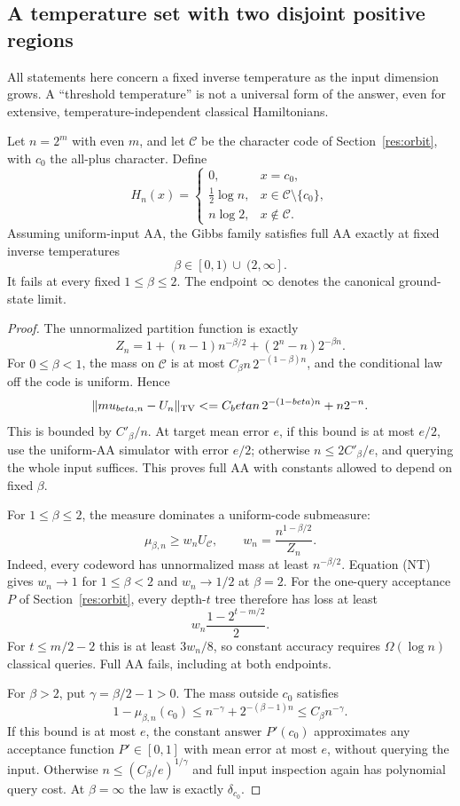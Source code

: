 \subsection{A temperature set with two disjoint positive regions}
\label{sec:resolution-nonmonotone}

All statements here concern a fixed inverse temperature as the input
dimension grows. A ``threshold temperature'' is not a universal form
of the answer, even for extensive, temperature-independent classical
Hamiltonians.

\begin{theorem}
Let $n=2^m$ with even $m$, and let $\mathcal C$ be the character code
of Section~\ref{res:orbit}, with $c_0$ the all-plus character. Define
\[
 H_n(x)=
 \begin{cases}
 0,&x=c_0,\\
 \tfrac12\log n,&x\in\mathcal C\setminus\{c_0\},\\
 n\log2,&x\notin\mathcal C.
 \end{cases}
\]
Assuming uniform-input AA, the Gibbs family satisfies full AA exactly
at fixed inverse temperatures
\[
 \boxed{\quad\beta\in[0,1)\ \cup\ (2,\infty].\quad}
\]
It fails at every fixed $1\le\beta\le2$. The endpoint $\infty$
denotes the canonical ground-state limit.
\end{theorem}

\begin{proof}
The unnormalized partition function is exactly
\[
 Z_n=1+(n-1)n^{-\beta/2}+(2^n-n)2^{-\beta n}.
 \tag{NT}
\]
For $0\le\beta<1$, the mass on $\mathcal C$ is at most
$C_\beta n\,2^{-(1-\beta)n}$, and the conditional law off the code
is uniform. Hence
\[
 \|\mu_{\beta,n}-U_n\|_{\rm TV}
 \le C_\beta n\,2^{-(1-\beta)n}+n2^{-n}.
\]
This is bounded by $C'_\beta/n$. At target mean error $e$, if this
bound is at most $e/2$, use the uniform-AA simulator with error $e/2$;
otherwise $n\le2C'_\beta/e$, and querying the whole input suffices.
This proves full AA with constants allowed to depend on fixed $\beta$.

For $1\le\beta\le2$, the measure dominates a uniform-code
submeasure:
\[
 \mu_{\beta,n}\ge w_n U_{\mathcal C},\qquad
 w_n=\frac{n^{1-\beta/2}}{Z_n}.
\]
Indeed, every codeword has unnormalized mass at least $n^{-\beta/2}$.
Equation (NT) gives $w_n\to1$ for $1\le\beta<2$ and $w_n\to1/2$
at $\beta=2$. For the one-query acceptance $P$ of
Section~\ref{res:orbit}, every depth-$t$ tree therefore has loss at
least
\[
 w_n\frac{1-2^{t-m/2}}2.
\]
For $t\le m/2-2$ this is at least $3w_n/8$, so constant accuracy
requires $\Omega(\log n)$ classical queries. Full AA fails, including
at both endpoints.

For $\beta>2$, put $\gamma=\beta/2-1>0$. The mass outside $c_0$
satisfies
\[
 1-\mu_{\beta,n}(c_0)
 \le n^{-\gamma}+2^{-(\beta-1)n}
 \le C_\beta n^{-\gamma}.
\]
If this bound is at most $e$, the constant answer $P'(c_0)$
approximates any acceptance function $P'\in[0,1]$ with mean error
at most $e$, without querying the input. Otherwise
$n\le(C_\beta/e)^{1/\gamma}$ and full input inspection again has
polynomial query cost. At $\beta=\infty$ the law is exactly
$\delta_{c_0}$.
\end{proof}

